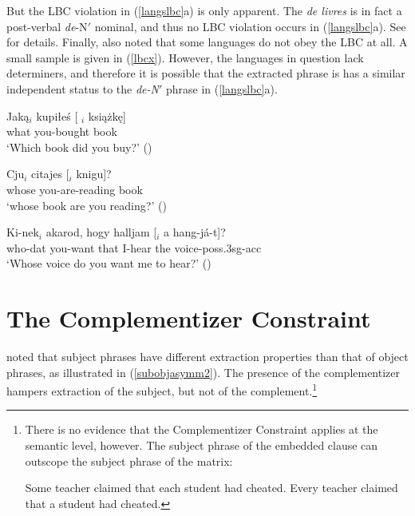 \documentclass[output=paper
 	        ,biblatex
                ,babelshorthands
                ,newtxmath
                ,draftmode
                ,colorlinks, citecolor=brown
]{langscibook}
\begin{document}
 \zl 


\noindent
But the LBC violation in (\ref{langslbc}a) is only apparent. The {\it de livres} is in fact a post-verbal {\it de}-N$'$ nominal, and thus no LBC violation occurs  in (\ref{langslbc}a). See \citet{Abeille:Bonami:ea:04} for details.
Finally, \citet{Ross67} also  noted that some languages do not obey the LBC at all. A small sample is given in (\ref{lbcx}). However, the languages  in question lack determiners, and therefore it is possible that
the extracted phrase is has a similar independent status to the  {\it de-N}$'$ phrase in (\ref{langslbc}a).
 
\ea
 \ea \gll Jak\k{a}$_i$  kupi\l{}e\'{s} { [ \spc$_i$ } ksi\k{a}\.{z}k\k{e}]\\
     what  you-bought  {} book\\
    \glt `Which book did you buy?' \hfill ()
       
 \ex \gll Cju$_i$  citajes [\spc$_i$  knigu]?\\
 whose  you-are-reading {}  book\\
  \glt `whose book are you reading?' \hfill ()
 
 \ex \gll Ki-nek$_i$  akarod,  hogy  halljam  {[\spc$_i$}  a  hang-j\'{a}-t]?\\
 who-{\sc dat}  you-want  that  I-hear {} the  voice-{\sc poss.3sg-acc}\\ 
\glt `Whose voice do you want me to hear?' \hfill ()
 \z \label{lbcx}
 \z
 

 
 
 
\section{The Complementizer Constraint}

\citet{Perlmutter68} noted that subject phrases have different extraction properties than that of object phrases, as illustrated in (\ref{subobjasymm2}). The presence of the complementizer hampers extraction of the subject, but not of the complement.\footnote{There is no evidence that the Complementizer Constraint applies at the semantic level, however. The  subject phrase of the embedded clause can outscope the subject phrase of  the matrix:

\eal
\ex Some teacher claimed that each student had cheated.
\ex Every teacher claimed that a student had cheated.
\zllast
} 
\end{document}

